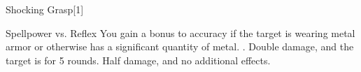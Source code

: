 \begin{spellsection}{Shocking Grasp}[1]
    \begin{spellheader}
    \end{spellheader}
    \begin{spellcontent}
        \begin{spelltargetinginfo}
        \end{spelltargetinginfo}
        \begin{spelleffects}
            \begin{spellattack}{Spellpower vs. Reflex}
                \spellspecial You gain a  bonus to accuracy if the target is wearing metal armor or otherwise has a significant quantity of metal.
                \spellsuccess {}.
                \spellcritical Double damage, and the target is \staggered for 5 rounds.
                \spellfailure Half damage, and no additional effects.
            \end{spellattack}
        \end{spelleffects}
    \end{spellcontent}
    \begin{spellfooter}
        \miscastexplode
    \end{spellfooter}
    \begin{spellaugments}
    \end{spellaugments}
\end{spellsection}

